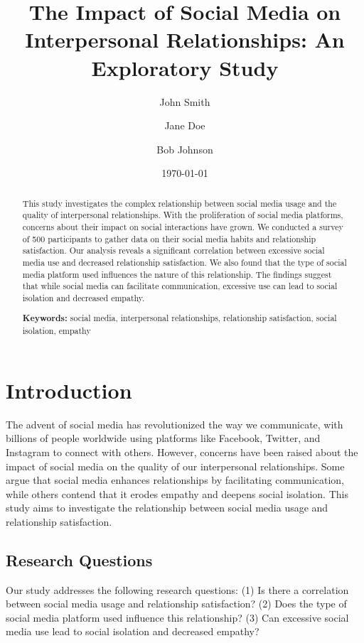 \documentclass[12pt,a4paper]{article}
\title{The Impact of Social Media on Interpersonal Relationships: An Exploratory Study}
\author{John Smith \and Jane Doe \and Bob Johnson}
\date{\today}
\begin{document}
\maketitle
\thispagestyle{empty}

\begin{abstract}
\setlength{\parindent}{0pt}
\noindent
This study investigates the complex relationship between social media usage and the quality of interpersonal relationships. With the proliferation of social media platforms, concerns about their impact on social interactions have grown. We conducted a survey of 500 participants to gather data on their social media habits and relationship satisfaction. Our analysis reveals a significant correlation between excessive social media use and decreased relationship satisfaction. We also found that the type of social media platform used influences the nature of this relationship. The findings suggest that while social media can facilitate communication, excessive use can lead to social isolation and decreased empathy.

\textbf{Keywords:} social media, interpersonal relationships, relationship satisfaction, social isolation, empathy
\end{abstract}

\newpage
\tableofcontents
\newpage

\twocolumn
\section{Introduction}
The advent of social media has revolutionized the way we communicate, with billions of people worldwide using platforms like Facebook, Twitter, and Instagram to connect with others. However, concerns have been raised about the impact of social media on the quality of our interpersonal relationships. Some argue that social media enhances relationships by facilitating communication, while others contend that it erodes empathy and deepens social isolation. This study aims to investigate the relationship between social media usage and relationship satisfaction.

\subsection{Research Questions}
Our study addresses the following research questions: (1) Is there a correlation between social media usage and relationship satisfaction? (2) Does the type of social media platform used influence this relationship? (3) Can excessive social media use lead to social isolation and decreased empathy?
\end{document}
